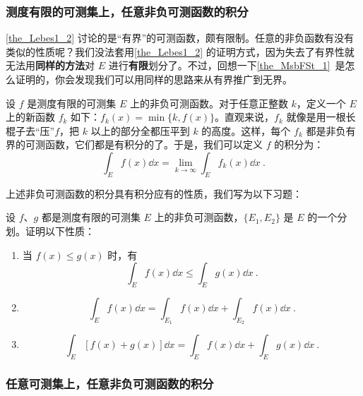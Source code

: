 \subsubsection{测度有限的可测集上，任意非负可测函数的积分}

\autoref{the_Lebes1_2} 讨论的是“有界”的可测函数，颇有限制。任意的非负函数有没有类似的性质呢？我们没法套用\autoref{the_Lebes1_2} 的证明方式，因为失去了有界性就无法用\textbf{同样的方法}对 $E$ 进行\textbf{有限}划分了。不过，回想一下\autoref{the_MsbFSt_1}~是怎么证明的，你会发现我们可以用同样的思路来从有界推广到无界。

设 $f$ 是测度有限的可测集 $E$ 上的非负可测函数。对于任意正整数 $k$，定义一个 $E$ 上的新函数 $f_k$ 如下：$f_k(x)=\min \{k, f(x)\}$。直观来说，$f_k$ 就像是用一根长棍子去“压”$f$，把 $k$ 以上的部分全都压平到 $k$ 的高度。这样，每个 $f_k$ 都是非负有界的可测函数，它们都是有积分的了。于是，我们可以定义 $f$ 的积分为：
\begin{equation}
\int_E f(x) \dd x = \lim\limits_{k\to\infty} \int_E f_k(x) \dd x~.
\end{equation}

上述非负可测函数的积分具有积分应有的性质，我们写为以下习题：

\begin{exercise}{}\label{exe_Lebes1_2}
设 $f$、$g$ 都是测度有限的可测集 $E$ 上的非负可测函数，$\{E_1, E_2\}$ 是 $E$ 的一个分划。证明以下性质：
\begin{enumerate}
\item 当 $f(x)\leq g(x)$ 时，有
\begin{equation}
\int_E f(x) \dd x\leq \int_E g(x) \dd x~.
\end{equation}
\item 
\begin{equation}
\int_E f(x) \dd x=\int_{E_1} f(x) \dd x+\int_{E_2} f(x) \dd x~.
\end{equation}
\item 
\begin{equation}
\int_E [f(x)+g(x)] \dd x = \int_E f(x) \dd x+\int_E g(x) \dd x~.
\end{equation}
\end{enumerate}

\end{exercise}




\subsubsection{任意可测集上，任意非负可测函数的积分}


